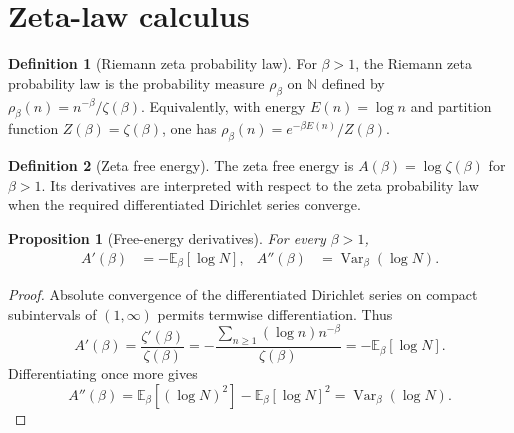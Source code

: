 \documentclass[11pt]{article}
\numberwithin{equation}{section}
\newtheorem{proposition}[theorem]{Proposition}
\theoremstyle{definition}
\newtheorem{definition}{Definition}[section]
\theoremstyle{remark}
\DeclareMathOperator{\Var}{Var}
\newcommand{\E}{\mathbb E}
\newcommand{\1}{\mathbf 1}
\begin{document}
\section{Zeta-law calculus}

\begin{definition}[Riemann zeta probability law]
\label{def:zeta-law}
For \(\beta>1\), the Riemann zeta probability law is the probability measure \(\rho_\beta\) on \(\mathbb N\) defined by \(\rho_\beta(n)=n^{-\beta}/\zeta(\beta)\). Equivalently, with energy \(E(n)=\log n\) and partition function \(Z(\beta)=\zeta(\beta)\), one has \(\rho_\beta(n)=e^{-\beta E(n)}/Z(\beta)\).
\end{definition}

\begin{definition}[Zeta free energy]
\label{def:zeta-free-energy}
The zeta free energy is \(A(\beta)=\log\zeta(\beta)\) for \(\beta>1\). Its derivatives are interpreted with respect to the zeta probability law when the required differentiated Dirichlet series converge.
\end{definition}

\begin{proposition}[Free-energy derivatives]
\label{prop:free-energy-derivatives}
For every \(\beta>1\),
\begin{align}
\label{eq:free-energy-derivatives}
A'(\beta)&=-\E_\beta[\log N],&
A''(\beta)&=\Var_\beta(\log N).
\end{align}
\end{proposition}

\begin{proof}
Absolute convergence of the differentiated Dirichlet series on compact subintervals of \((1,\infty)\) permits termwise differentiation.  Thus
\begin{equation}
\label{eq:first-free-derivative-proof}
A'(\beta)=\frac{\zeta'(\beta)}{\zeta(\beta)}
=-\frac{\sum_{n\ge1}(\log n)n^{-\beta}}{\zeta(\beta)}
=-\E_\beta[\log N].
\end{equation}
Differentiating once more gives
\begin{equation}
\label{eq:second-free-derivative-proof}
A''(\beta)=\E_\beta[(\log N)^2]-\E_\beta[\log N]^2
=\Var_\beta(\log N).
\end{equation}
\end{proof}
\end{document}

